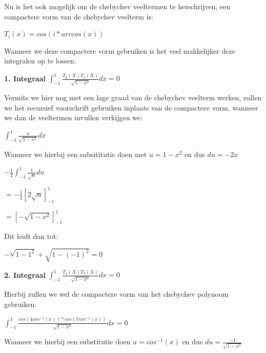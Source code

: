 \documentclass{article}
\begin{document}
\begin{flushleft}
Nu is het ook mogelijk om de chebychev veeltermen te herschrijven, een compactere vorm van de chebychev veelterm is:
\newline

$T_{i}(x) = cos(i*arccos(x))$
\newline

Wanneer we deze compactere vorm gebruiken is het veel makkelijker deze integralen op te lossen.
\newline

\textbf{1. Integraal}
$ \int_{-1}^{1}  \frac{T_{0}(X)T_{1}(X)}{\sqrt{1-x^{2}}} dx = 0 $
\newline

Vermits we hier nog met een lage graad van de chebychev veelterm werken, zullen we het recursief voorschrift gebruiken inplaats van de compactere vorm, wanneer we dan de veeltermen invullen verkijgen we:
\newline

$ \int_{-1}^{1}  \frac{x}{\sqrt{1-x^{2}}} dx $
\newline

Wanneer we hierbij een subsititutie doen met $u = 1 - x^{2} $ en dus $ du = -2x $
\newline

$ -\frac{1}{2} \int_{-1}^{1}  \frac{1}{\sqrt{u}} du $
\newline

$ =  -\frac{1}{2} [ 2\sqrt{u} ]^{1}_{-1} $
\newline

$ =  [-\sqrt{1 - x^{2} } ]^{1}_{-1} $
\newline

Dit leidt dan tot:
\newline

$ -\sqrt{1 - 1^{2} } + \sqrt{1 - (-1)^{2} } = 0 $
\newline


\textbf{2. Integraal}
$ \int_{-1}^{1}  \frac{T_{4}(X)T_{7}(X)}{\sqrt{1-x^{2}}} dx = 0 $
\newline

Hierbij zullen we wel de compactere vorm van het chebychev polynoom gebruiken:
\newline

$ \int_{-1}^{1}  \frac{ cos(4cos^{-1}(x)) * cos(7cos^{-1}(x)) }{\sqrt{1-x^{2}}} dx = 0 $
\newline

Wanneer we hierbij een substitutie doen $u = cos^{-1}(x) $ en dus $ du = \frac{-1}{\sqrt{1-x^{2}}} $
\newline


\end{flushleft}
\end{document}
